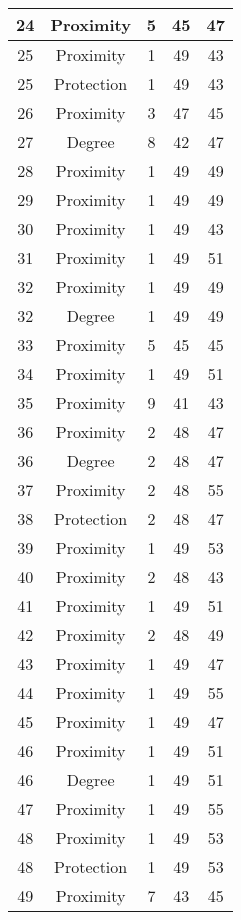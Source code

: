 \documentclass[results.tex]{subfiles}
\begin{document}
\begin{center}
\begin{tabular}{| c || c | c | c | c |}
    \hline
    24 & Proximity & 5 & 45 & 47 \\ 
    \hline
    25 & Proximity & 1 & 49 & 43 \\ 
    \hline
    25 & Protection & 1 & 49 & 43 \\ 
    \hline
    26 & Proximity & 3 & 47 & 45 \\ 
    \hline
    27 & Degree & 8 & 42 & 47 \\ 
    \hline
    28 & Proximity & 1 & 49 & 49 \\ 
    \hline
    29 & Proximity & 1 & 49 & 49 \\ 
    \hline
    30 & Proximity & 1 & 49 & 43 \\ 
    \hline
    31 & Proximity & 1 & 49 & 51 \\ 
    \hline
    32 & Proximity & 1 & 49 & 49 \\ 
    \hline
    32 & Degree & 1 & 49 & 49 \\ 
    \hline
    33 & Proximity & 5 & 45 & 45 \\ 
    \hline
    34 & Proximity & 1 & 49 & 51 \\ 
    \hline
    35 & Proximity & 9 & 41 & 43 \\ 
    \hline
    36 & Proximity & 2 & 48 & 47 \\ 
    \hline
    36 & Degree & 2 & 48 & 47 \\ 
    \hline
    37 & Proximity & 2 & 48 & 55 \\ 
    \hline
    38 & Protection & 2 & 48 & 47 \\ 
    \hline
    39 & Proximity & 1 & 49 & 53 \\ 
    \hline
    40 & Proximity & 2 & 48 & 43 \\ 
    \hline
    41 & Proximity & 1 & 49 & 51 \\ 
    \hline
    42 & Proximity & 2 & 48 & 49 \\ 
    \hline
    43 & Proximity & 1 & 49 & 47 \\ 
    \hline
    44 & Proximity & 1 & 49 & 55 \\ 
    \hline
    45 & Proximity & 1 & 49 & 47 \\ 
    \hline
    46 & Proximity & 1 & 49 & 51 \\ 
    \hline
    46 & Degree & 1 & 49 & 51 \\ 
    \hline
    47 & Proximity & 1 & 49 & 55 \\ 
    \hline
    48 & Proximity & 1 & 49 & 53 \\ 
    \hline
    48 & Protection & 1 & 49 & 53 \\ 
    \hline
    49 & Proximity & 7 & 43 & 45 \\ 
    \hline   \end{tabular}
\end{center}
\end{document}
